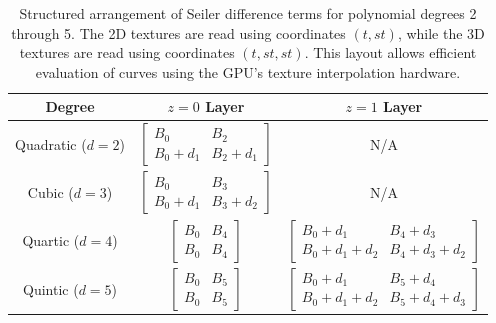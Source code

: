 \documentclass{jcgt}
\begin{document}
\begin{table}[H]
\centering
\renewcommand{\arraystretch}{1.5}

\begin{tabular}{|c|c|c|}
\hline
\textbf{Degree} & \textbf{$z=0$ Layer} & \textbf{$z=1$ Layer} \\
\hline

Quadratic ($d=2$) &
$\begin{bmatrix}
B_0 & B_2 \\
B_0 + d_1 & B_2 + d_1
\end{bmatrix}$
&
N/A\\
\hline

Cubic ($d=3$) &
$\begin{bmatrix}
B_0 & B_3 \\
B_0 + d_1 & B_3 + d_2
\end{bmatrix}$
&
N/A\\
\hline


Quartic ($d=4$) &
$\begin{bmatrix}
B_0 & B_4 \\
B_0 & B_4
\end{bmatrix}$
&
$\begin{bmatrix}
B_0 + d_1 & B_4 + d_3 \\
B_0 + d_1 + d_2 & B_4 + d_3 + d_2
\end{bmatrix}$

\\
\hline

Quintic ($d=5$) &
$\begin{bmatrix}
B_0 & B_5 \\
B_0 & B_5
\end{bmatrix}$
&
$\begin{bmatrix}
B_0 + d_1 & B_5 + d_4 \\
B_0 + d_1 + d_2 & B_5 + d_4 + d_3
\end{bmatrix}$
\\
\hline

\end{tabular}

\caption{Structured arrangement of Seiler difference terms for polynomial degrees 2 through 5. The 2D textures are read using coordinates $(t, st)$, while the 3D textures are read using coordinates $(t, st, st)$. This layout allows efficient evaluation of curves using the GPU's texture interpolation hardware.}
\label{tab:SeilerLayout}
\end{table}
\end{document}
